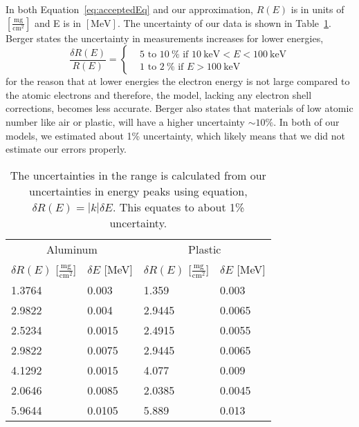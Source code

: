 In both Equation~\eqref{eq:acceptedEq} and our approximation, $R(E)$ is in units of $[\frac{\text{mg}}{\text{cm}^2}]$ and E is in $[\text{MeV}]$. The uncertainty of our data is shown in Table~\ref{tab:uncertaintyConversion}. Berger states the uncertainty in measurements increases for lower energies, 
\begin{equation}
	\frac{\delta R(E)}{R(E)} = 
	\begin{cases}
		& 5 \text{~to~} 10~\% \text{ if } 10~\text{keV}<E<100~\text{keV} \\
		& 1 \text{~to~} 2~\% \text{ if } E>100~\text{keV} 
	\end{cases}
\end{equation}
for the reason that at lower energies the electron energy is not large compared to the atomic electrons and therefore, the model, lacking any electron shell corrections, becomes less accurate. Berger also states that materials of low atomic number like air or plastic, will have a higher uncertainty $\sim 10\%$. In both of our models, we estimated about 1\% uncertainty, which likely means that we did not estimate our errors properly.
\begin{table}
	\begin{center}
		\begin{tabular}
			{llll} \toprule \multicolumn{2}{c}{Aluminum} & \multicolumn{2}{c}{Plastic}\\
			\cmidrule(r){1-2} 
			\cmidrule(r){3-4} 
			$\delta R(E)$ [$\frac{\text{mg}}{\text{cm}^2}$] & $\delta E$ [MeV] & $\delta R(E)$ [$\frac{\text{mg}}{\text{cm}^2}$] & $\delta E$ [MeV]\\
			\midrule 
			1.3764 & 0.003 	& 1.359 	& 0.003 \\
			2.9822 & 0.004 	& 2.9445 	& 0.0065\\
			2.5234 & 0.0015 & 2.4915 	& 0.0055\\
			2.9822 & 0.0075 & 2.9445 	& 0.0065\\
			4.1292 & 0.0015 & 4.077 	& 0.009\\
			2.0646 & 0.0085 & 2.0385 	& 0.0045\\
			5.9644 & 0.0105 & 5.889 	& 0.013\\
			\bottomrule 
		\end{tabular}
	\end{center}
	\caption{The uncertainties in the range is calculated from our uncertainties in energy peaks using equation,\cite{093570275X} $\delta R(E) = |k| \delta E$. This equates to about 1\% uncertainty.} \label{tab:uncertaintyConversion} 
\end{table}


